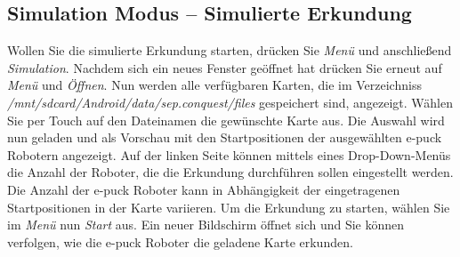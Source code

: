 \documentclass[10pt,a4paper]{article}
\begin{document}
	\subsection{Simulation Modus -- Simulierte Erkundung}
	\label{subsec:simulierte_erkundung}
		Wollen Sie die simulierte Erkundung starten, dr\"ucken Sie \textit{Men\"u} und anschlie\ss end \textit{Simulation}. Nachdem sich ein neues Fenster ge\"offnet hat
		dr\"ucken Sie erneut auf  \textit{Men\"u} und \textit{\"Offnen}. Nun werden alle verf\"ugbaren Karten, die im Verzeichniss 
		\textit{/mnt/sdcard/Android/data/sep.conquest/files} gespeichert sind, angezeigt. W\"ahlen Sie per Touch auf den Dateinamen die gew\"unschte Karte aus. Die
		Auswahl wird nun geladen und als Vorschau mit den Startpositionen der ausgew\"ahlten e-puck Robotern angezeigt. Auf der linken Seite k\"onnen mittels eines 
		Drop-Down-Men\"us die Anzahl der Roboter, die die Erkundung durchf\"uhren sollen eingestellt werden. Die Anzahl der e-puck 	Roboter kann in Abh\"angigkeit 
		der eingetragenen Startpositionen in der Karte variieren. Um die Erkundung zu starten, w\"ahlen Sie im \textit{Men\"u} nun \textit{Start} aus. Ein neuer Bildschirm 
		\"offnet sich und Sie k\"onnen verfolgen, wie die e-puck Roboter  die geladene Karte erkunden.
\end{document}
